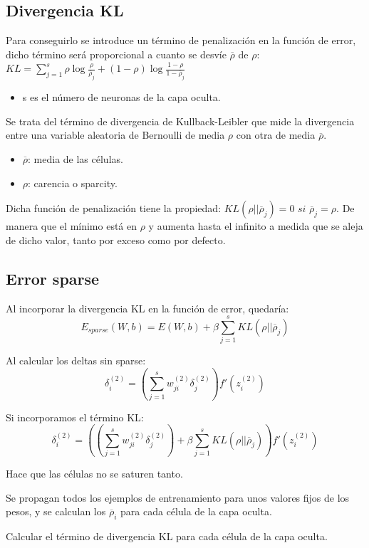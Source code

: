 \documentclass[12pt, twoside, openright]{report} %
\begin{document}
\subsection{Divergencia KL}
Para conseguirlo se introduce un término de penalización en la función de error, dicho término será proporcional a cuanto se desvíe $\overline{\rho}$ de $\rho$:
$KL= \sum_{j=1}^s \rho \log \frac{\rho}{\overline{\rho}_j}+(1-\rho) \log \frac{1-\rho}{1-\overline{\rho}_j}$
\begin{itemize}
	\item s es el número de neuronas de la capa oculta.
\end{itemize}
\pagebreak
Se trata del término de divergencia de Kullback-Leibler que mide la divergencia entre una variable aleatoria de Bernoulli de media $\rho$ con otra de media $\overline{\rho}$.
\begin{itemize}
	\item $\overline{\rho}$: media de las células.
	\item $\rho$: carencia o sparcity.
\end{itemize}

Dicha función de penalización tiene la propiedad: $KL(\rho||\overline{\rho}_j) = 0 \textit{ si } \overline{\rho}_j = \rho$. De manera que el mínimo está en $\rho$ y aumenta hasta el infinito a medida que se aleja de dicho valor, tanto por exceso como por defecto.

\subsection{Error sparse}
Al incorporar la divergencia KL en la función de error, quedaría:
$$E_{sparse}(W, b)=E(W,b)+\beta \sum^s_{j=1}KL(\rho||\overline{\rho}_j)$$

Al calcular los deltas sin sparse:
$$\delta_i^{(2)} = \left(\sum^s_{j=1}w_{ji}^{(2)}\delta^{(2)}_j\right)f'(z_i^{(2)})$$

Si incorporamos el término KL:
$$\delta_i^{(2)} = \left(\left(\sum^s_{j=1}w_{ji}^{(2)}\delta^{(2)}_j\right)+\beta \sum^s_{j=1}KL(\rho||\overline{\rho}_j)\right)f'(z_i^{(2)})$$

Hace que las células no se saturen tanto.

Se propagan todos los ejemplos de entrenamiento para unos valores fijos de los pesos, y se calculan los $\overline{\rho}_i$ para cada célula de la capa oculta.

Calcular el término de divergencia KL para cada célula de la capa oculta.
\end{document}
